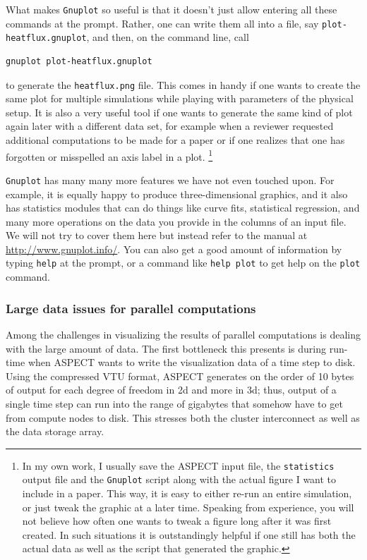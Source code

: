 \documentclass{article}
\newcommand{\aspect}{\textsc{ASPECT}}
\begin{document}
What makes \texttt{Gnuplot} so useful is that it doesn't just allow entering
all these commands at the prompt. Rather, one can write them all into a file,
say \texttt{plot-heatflux.gnuplot}, and then, on the command line, call
\begin{lstlisting}[frame=single,language=ksh]
  gnuplot plot-heatflux.gnuplot
\end{lstlisting}
to generate the \texttt{heatflux.png} file. This comes in handy if one wants
to create the same plot for multiple simulations while playing with parameters
of the physical setup. It is also a very useful tool if one wants to generate
the same kind of plot again later with a different data set, for example when
a reviewer requested additional computations to be made for a paper or if one
realizes that one has forgotten or misspelled an axis label in a plot.%
\footnote{In my own work, I usually save the \aspect{} input file, the
  \texttt{statistics} output file and the \texttt{Gnuplot} script along with
  the actual figure I want to include in a paper. This way, it is easy to
  either re-run an entire simulation, or just tweak the graphic at a later
  time. Speaking from experience, you will not believe how often one wants
  to tweak a figure long after it was first created. In such situations it is
  outstandingly helpful if one still has both the actual data as well as the script
  that generated the graphic.}

\texttt{Gnuplot} has many many more features we have not even touched upon. For
example, it is equally happy to produce three-dimensional graphics, and it also
has statistics modules that can do things like curve fits, statistical regression,
and many more operations on the data you provide in the columns of an input file.
We will not try to cover them here but instead refer to the manual at
\url{http://www.gnuplot.info/}. You can also get a good amount of information
by typing \texttt{help} at the prompt, or a command like \texttt{help plot} to
get help on the \texttt{plot} command.


\subsubsection{Large data issues for parallel computations}
\label{sec:viz-data}

Among the challenges in visualizing the results of parallel computations is
dealing with the large amount of data. The first bottleneck this presents is
during run-time when \aspect{} wants to write the visualization data of a time
step to disk. Using the compressed VTU format, \aspect{} generates on the
order of 10 bytes of output for each degree of freedom in 2d and more in 3d;
thus, output of a single time step can run into the range of gigabytes that
somehow have to get from compute nodes to disk. This stresses both the cluster
interconnect as well as the data storage array.
\end{document}
